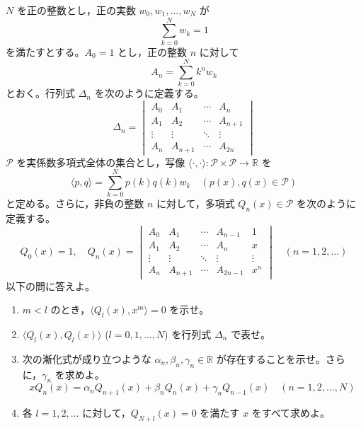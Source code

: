 \documentclass[12pt]{jlreq}
\begin{document}
$N$ を正の整数とし，正の実数 $w_0, w_1, \dots, w_N$ が
\[
  \sum_{k=0}^N w_k = 1
\]
を満たすとする。$A_0 = 1$ とし，正の整数 $n$ に対して
\[
  A_n = \sum_{k=0}^N k^n w_k
\]
とおく。行列式 $\Delta_n$ を次のように定義する。
\[
  \Delta_n = \begin{vmatrix} A_0 & A_1 & \cdots & A_n \\ A_1 & A_2 & \cdots & A_{n+1} \\ \vdots & \vdots & \ddots & \vdots \\ A_n & A_{n+1} & \cdots & A_{2n} \end{vmatrix}
\]
$\mathcal{P}$ を実係数多項式全体の集合とし，写像 $\langle \cdot, \cdot \rangle : \mathcal{P} \times \mathcal{P} \to \mathbb{R}$ を
\[
  \langle p, q \rangle = \sum_{k=0}^N p(k)q(k)w_k \quad (p(x), q(x) \in \mathcal{P})
\]
と定める。さらに，非負の整数 $n$ に対して，多項式 $Q_n(x) \in \mathcal{P}$ を次のように定義する。
\[
  Q_0(x) = 1,\quad Q_n(x) = \begin{vmatrix} A_0 & A_1 & \cdots & A_{n-1} & 1 \\ A_1 & A_2 & \cdots & A_n & x \\ \vdots & \vdots & \ddots & \vdots & \vdots \\ A_n & A_{n+1} & \cdots & A_{2n-1} & x^n \end{vmatrix} \quad (n = 1, 2, \dots)
\]
以下の問に答えよ。

\begin{enumerate}
  \item $m < l$ のとき，$\langle Q_l(x), x^m \rangle = 0$ を示せ。
  \item $\langle Q_l(x), Q_l(x) \rangle$ ($l = 0, 1, \dots, N$) を行列式 $\Delta_n$ で表せ。
  \item 次の漸化式が成り立つような $\alpha_n, \beta_n, \gamma_n \in \mathbb{R}$ が存在することを示せ。さらに，$\gamma_n$ を求めよ。
  \[
    xQ_n(x) = \alpha_n Q_{n+1}(x) + \beta_n Q_n(x) + \gamma_n Q_{n-1}(x) \quad (n = 1, 2, \dots, N)
  \]
  \item 各 $l = 1, 2, \dots$ に対して，$Q_{N+l}(x) = 0$ を満たす $x$ をすべて求めよ。
\end{enumerate}
\end{document}
